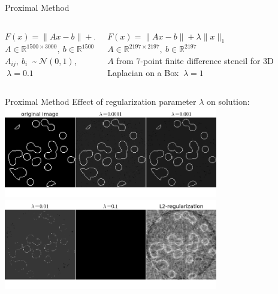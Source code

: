 \documentclass[10pt]{beamer}
\begin{document}
   \begin{frame}{Proximal Method}
   	\begin{columns}[T]
   		\begin{column}{.5\textwidth}
   			$F(x) = \lVert Ax - b \rVert + \lambda \lVert x \rVert_1$\\
   			$A \in \mathbb{R}^{1500 \times 3000},\:b \in \mathbb{R}^{1500}$\\
   			$A_{ij},\:b_i\:$ \textasciitilde $\:\mathcal{N}(0,1)$, $\:\lambda = 0.1$\\
   			\vspace{28pt}
   			\resizebox{\linewidth}{!}{}
   		\end{column}\hfill
   		\begin{column}{.5\textwidth}
   			$F(x) = \lVert Ax - b \rVert + \lambda \lVert x \rVert_1$\\
   			$A \in \mathbb{R}^{2197 \times 2197},\:b \in \mathbb{R}^{2197}$\\
   			$A$ from 7-point finite difference stencil for 3D Laplacian on a Box $\:\lambda = 1$\\
   			\vspace{10pt}
   			\resizebox{\linewidth}{!}{}
   		\end{column}
   	\end{columns}
   \end{frame}
   
   \begin{frame}{Proximal Method}
   	\alert{Effect of regularization parameter $\lambda$ on solution:}\\
   	\centering\includegraphics[width = 0.7\textwidth]{lambda1.png}\\
   	\centering\includegraphics[width = 0.7\textwidth]{lambda2.png}
   \end{frame}
   
\end{document}
